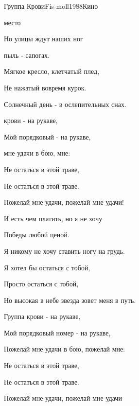 \begin{song}{Группа Крови}{Fis-moll}{1988}{Кино}{}{}

\begin{SBVerse}
	 место

	Но улицы ждут  наших ног

	 пыль -  сапогах.

	Мягкое кресло, клетчатый плед,

	Не нажатый вовремя курок.

	Солнечный день - в ослепительных снах.
\end{SBVerse}

\begin{SBChorus}
	 крови - на рукаве,

	Мой порядковый  - на рукаве,

	 мне удачи в бою,  мне:

	Не остаться в этой траве,

	Не остаться в этой траве.

	Пожелай мне удачи, пожелай мне удачи!
\end{SBChorus}

\begin{SBVerse}
	И есть чем платить, но я не хочу

	Победы любой ценой.

	Я никому не хочу ставить ногу на грудь.

	Я хотел бы остаться с тобой,

	Просто остаться с тобой,

	Но высокая в небе звезда зовет меня в путь.
\end{SBVerse}

\begin{SBChorus}
	Группа крови - на рукаве,

	Мой порядковый номер - на рукаве,

	Пожелай мне удачи в бою, пожелай мне:

	Не остаться в этой траве,

	Не остаться в этой траве.

	Пожелай мне удачи, пожелай мне удачи
\end{SBChorus}
\end{song}
